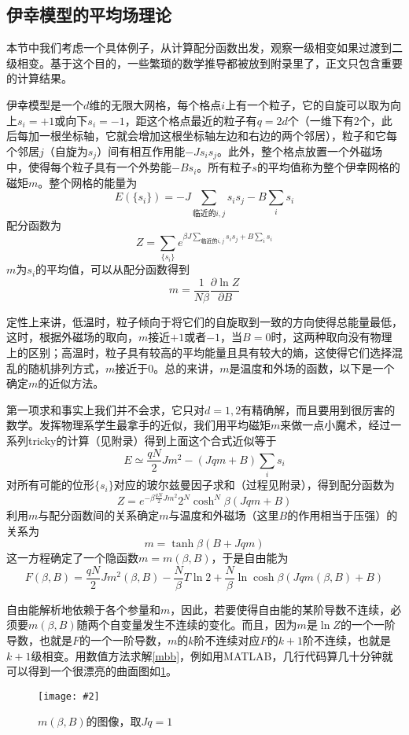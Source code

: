 \documentclass[a4paper,11pt]{ctexart}
\newcommand{\beq}{\begin{equation}}
\newcommand{\eeq}{\end{equation}}
\newcommand{\cpic}[2]{
\begin{center}
\texttt{[image: \#2]}
\end{center}
}
\newcommand{\cpicn}[3]
{
\begin{figure}[H]
\cpic{#1}{#2}
\caption{#3\label{#2}}
\end{figure}
}
\begin{document}
\subsection{伊幸模型的平均场理论}
本节中我们考虑一个具体例子，从计算配分函数出发，观察一级相变如果过渡到二级相变。基于这个目的，一些繁琐的数学推导都被放到附录里了，正文只包含重要的计算结果。\par
伊幸模型是一个$d$维的无限大网格，每个格点$i$上有一个粒子，它的自旋可以取为向上$s_i=+1$或向下$s_i=-1$，距这个格点最近的粒子有$q=2d$个（一维下有2个，此后每加一根坐标轴，它就会增加这根坐标轴左边和右边的两个邻居），粒子和它每个邻居$j$（自旋为$s_j$）间有相互作用能$-Js_is_j$。此外，整个格点放置一个外磁场中，使得每个粒子具有一个外势能$-Bs_i$。所有粒子$s$的平均值称为整个伊幸网格的磁矩$m$。整个网格的能量为
\beq
E(\{s_i\}) = -J\sum_{\text{临近的}i,j} s_i s_j - B \sum_{i} s_i
\eeq
配分函数为
\beq
Z=\sum_{\{s_i\}} e^{\beta J\sum_{\text{临近的}i,j} s_i s_j + B \sum_{i} s_i}
\eeq
$m$为$s_i$的平均值，可以从配分函数得到
\beq
m = \frac{1}{N\beta}\frac{\partial \ln Z}{\partial B}
\eeq
\par
定性上来讲，低温时，粒子倾向于将它们的自旋取到一致的方向使得总能量最低，这时，根据外磁场的取向，$m$接近$+1$或者$-1$，当$B=0$时，这两种取向没有物理上的区别；高温时，粒子具有较高的平均能量且具有较大的熵，这使得它们选择混乱的随机排列方式，$m$接近于0。总的来讲，$m$是温度和外场的函数，以下是一个确定$m$的近似方法。
\par
第一项求和事实上我们并不会求，它只对$d=1,2$有精确解，而且要用到很厉害的数学。发挥物理系学生最拿手的近似，我们用平均磁矩$m$来做一点小魔术，经过一系列tricky的计算（见附录）得到上面这个合式近似等于
\beq
E \simeq \frac{qN}{2}Jm^2 - (Jqm+B)\sum_i s_i
\eeq
对所有可能的位形$\{s_i\}$对应的玻尔兹曼因子求和（过程见附录），得到配分函数为
\beq
Z =  e^{-\beta \frac{qN}{2}Jm^2}2^N\cosh^N\beta(Jqm+B)
\eeq
利用$m$与配分函数间的关系确定$m$与温度和外磁场（这里$B$的作用相当于压强）的关系为
\beq \label{mbb}
m = \tanh\beta(B + Jqm)
\eeq
这一方程确定了一个隐函数$m=m(\beta,B)$，于是自由能为
\beq
F(\beta,B) = \frac{qN}{2}Jm^2(\beta,B) -\frac{N}{\beta} T \ln 2 + \frac{N}{\beta} \ln\cosh\beta(Jqm(\beta,B)+B)
\eeq
\par
自由能解析地依赖于各个参量和$m$，因此，若要使得自由能的某阶导数不连续，必须要$m(\beta,B)$随两个自变量发生不连续的变化。而且，因为$m$是$\ln Z$的一个一阶导数，也就是$F$的一个一阶导数，$m$的$k$阶不连续对应$F$的$k+1$阶不连续，也就是$k+1$级相变。用数值方法求解\cref{mbb}，例如用MATLAB，几行代码算几十分钟就可以得到一个很漂亮的曲面图如\cref{mbetab}。
\cpicn{0.3}{mbetab}{$m(\beta,B)$的图像，取$Jq = 1$}
\end{document}
